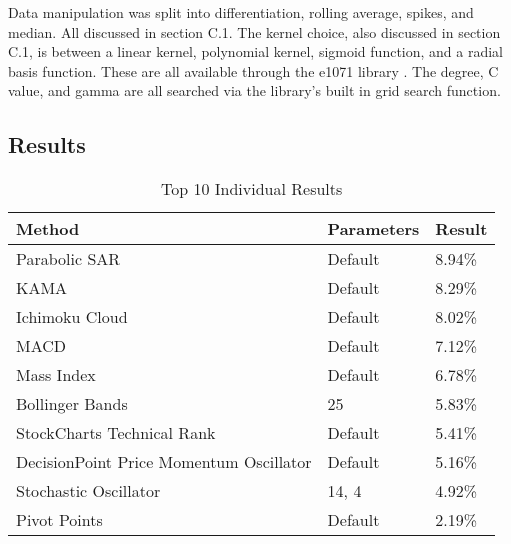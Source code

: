\documentclass[conference]{IEEEtran}
\begin{document}
Data manipulation was split into differentiation, rolling average, spikes, and median. All discussed in section C.1. The kernel choice, also discussed in section C.1, is between a linear kernel, polynomial kernel, sigmoid function, and a radial basis function. These are all available through the e1071 library \cite{Meyer2017}. The degree, C value, and gamma are all searched via the library's built in grid search function. 

\subsection{Results}

\begin{table*}
\centering
\label{units}
\begin{tabu}{ |p{4cm}|p{4cm}|p{4cm}|}\hline\hline
Method & Parameters & Result \\ \hline
Parabolic SAR & Default & 8.94\% \\ \hline
KAMA & Default & 8.29\% \\ \hline
Ichimoku Cloud & Default & 8.02\% \\ \hline
MACD & Default & 7.12\% \\ \hline
Mass Index & Default & 6.78\% \\ \hline
Bollinger Bands & 25 & 5.83\% \\ \hline
StockCharts Technical Rank & Default & 5.41\% \\ \hline
DecisionPoint Price Momentum Oscillator & Default & 5.16\% \\ \hline
Stochastic Oscillator & 14, 4 & 4.92\% \\ \hline
Pivot Points & Default & 2.19\% \\ \hline
\end{tabu}
\vspace{2 mm}
\caption{Top 10 Individual Results}
\end{table*}
\end{document}

